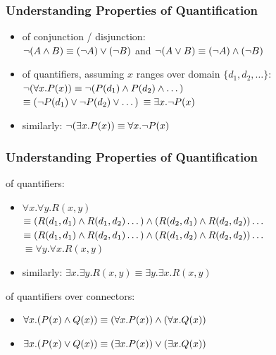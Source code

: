 \documentclass{beamer}
\begin{document}
\begin{frame}[fragile]\frametitle{Understanding Properties of Quantification}

  \begin{itemize}
  \item of conjunction / disjunction:\\
    $\neg (A \wedge B) \equiv (\neg A) \vee (\neg B)$ and
    $\neg (A \vee B) \equiv (\neg A) \wedge (\neg B)$

  \item of quantifiers, assuming $x$ ranges over domain $\{d_1, d_2, \dots \}$:\\
    $\neg (\forall x. P(x)) \equiv \neg (P(d_1) \wedge P(d_2) \wedge \dots)$\\
    $\equiv (\neg P(d_1) \vee \neg P(d_2) \vee \dots)$
    $\equiv \exists x. \neg P(x)$
  \item similarly: $\neg (\exists x. P(x)) \equiv \forall x. \neg P(x)$

  \end{itemize}

\end{frame}

\begin{frame}[fragile]\frametitle{Understanding Properties of Quantification}


   of quantifiers: 
  \begin{itemize}
  \item $\forall x. \forall y. R(x,y)$\\
    $\equiv (R(d_1,d_1) \wedge R(d_1,d_2) \dots) \wedge (R(d_2,d_1) \wedge R(d_2,d_2)) \dots$\\
    $\equiv (R(d_1,d_1) \wedge R(d_2,d_1) \dots) \wedge (R(d_1,d_2) \wedge  R(d_2,d_2)) \dots$\\
    $\equiv \forall y. \forall x. R(x,y)$
  \item similarly: $\exists x. \exists y. R(x,y) \equiv \exists y. \exists x. R(x, y)$
  \end{itemize}


  \vspace{5mm}
   of quantifiers over connectors:
  \begin{itemize}
  \item $\forall x. (P(x) \wedge Q(x)) \equiv (\forall x. P(x)) \wedge (\forall x. Q(x))$ 
  \item $\exists x. (P(x) \vee Q(x)) \equiv (\exists x. P(x)) \vee (\exists x. Q(x))$ 
  \end{itemize}

\end{frame}
\end{document}
